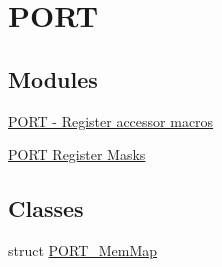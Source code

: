 \hypertarget{group___p_o_r_t___peripheral}{}\section{P\+O\+RT}
\label{group___p_o_r_t___peripheral}
\subsection*{Modules}
\begin{DoxyCompactItemize}
\item 
\hyperlink{group___p_o_r_t___register___accessor___macros}{P\+O\+R\+T -\/ Register accessor macros}
\item 
\hyperlink{group___p_o_r_t___register___masks}{P\+O\+R\+T Register Masks}
\end{DoxyCompactItemize}
\subsection*{Classes}
\begin{DoxyCompactItemize}
\item 
struct \hyperlink{struct_p_o_r_t___mem_map}{P\+O\+R\+T\+\_\+\+Mem\+Map}
\end{DoxyCompactItemize}
